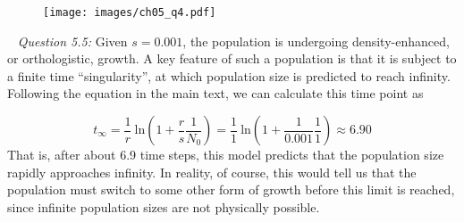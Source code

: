 \documentclass[12pt]{article}
\begin{document}
\begin{figure}[ht]
  \centering
  \texttt{[image: images/ch05\_q4.pdf]}
\end{figure}

~\newline
\textit{Question 5.5:}
\newline
Given $s = 0.001$, the population is undergoing density-enhanced, or orthologistic, growth. A key feature of such a population is that it is subject to a finite time ``singularity'', at which population size is predicted to reach infinity. Following the equation in the main text, we can calculate this time point as

$$t_\infty = \frac{1}{r}~\mathrm{ln}\left(1 + \frac{r}{s}\frac{1}{N_0} \right) = \frac{1}{1}~\mathrm{ln}\left(1 + \frac{1}{0.001}\frac{1}{1} \right) \approx 6.90$$
That is, after about 6.9 time steps, this model predicts that the population size rapidly approaches infinity. In reality, of course, this would tell us that the population must switch to some other form of growth before this limit is reached, since infinite population sizes are not physically possible.
\end{document}
